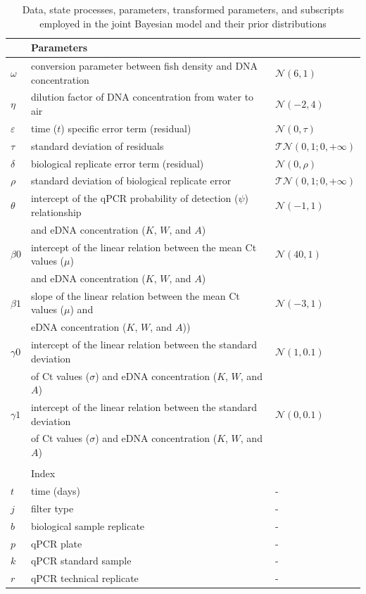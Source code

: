 \documentclass{article}
\begin{document}
\begin{table}
\begin{tabular}{lll}
&Parameters&\\
\hline
$\omega$& conversion parameter between fish density
and DNA concentration & $\mathcal{N}(6,1)$\\
$\eta$& dilution factor of DNA concentration
from water to air & $\mathcal{N}(-2,4)$\\
$\varepsilon$& time ($t$) specific error term (residual) & $\mathcal{N}(0,\tau)$\\
$\tau$& standard deviation of residuals & $\mathcal{TN}(0,1;0, +\infty)$\\
$\delta$& biological replicate error term (residual) & $\mathcal{N}(0,\rho)$\\
$\rho$& standard deviation of biological replicate error & $\mathcal{TN}(0,1;0, +\infty)$\\
$\theta$& intercept of the qPCR probability of detection ($\psi$) relationship &$\mathcal{N}(-1,1)$\\
& and eDNA concentration ($K$, $W$, and $A$) \\
$\beta0$& intercept of the linear relation between the mean Ct values ($\mu$)&$\mathcal{N}(40,1)$\\
&and eDNA concentration ($K$, $W$, and $A$) & \\
$\beta1$& slope of the linear relation between the mean Ct values ($\mu$) and &$\mathcal{N}(-3,1)$\\
&eDNA concentration ($K$, $W$, and $A$)) & \\
$\gamma0$& intercept of the linear relation between the standard deviation&$\mathcal{N}(1,0.1)$\\
&of Ct values ($\sigma$) and eDNA concentration ($K$, $W$, and $A$) & \\
$\gamma1$& intercept of the linear relation between the standard deviation &$\mathcal{N}(0,0.1)$\\
&of Ct values ($\sigma$) and eDNA concentration ($K$, $W$, and $A$) & \\
&&\\
&Index&\\
\hline
$t$& time (days) & -\\
$j$& filter type & -\\
$b$& biological sample replicate & -\\
$p$& qPCR plate & -\\
$k$& qPCR standard sample & -\\
$r$& qPCR technical replicate & -\\


    \end{tabular}
    \caption{Data, state processes, parameters, transformed parameters, and subscripts employed in the joint Bayesian model and their prior distributions}
    \label{tab:priortable}
\end{table}
\end{document}
